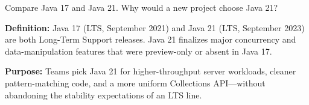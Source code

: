 



\question[6]
Compare Java 17 and Java 21. Why would a new project choose Java 21?
\begin{solutionorbox}[5.5in]
\textbf{Definition:} Java 17 (LTS, September 2021) and Java 21 (LTS, September 2023) are both Long-Term Support releases. Java 21 finalizes major concurrency and data-manipulation features that were preview-only or absent in Java 17.

\textbf{Purpose:} Teams pick Java 21 for higher-throughput server workloads, cleaner pattern-matching code, and a more uniform Collections API---without abandoning the stability expectations of an LTS line.


\end{solutionorbox}
